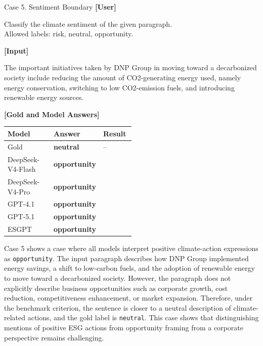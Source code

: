 \documentclass[11pt]{article}
\newcommand{\xmarkred}{\textcolor{casered}{\ding{55}}}
\newcommand{\goldans}[1]{\textbf{#1}}
\newcommand{\wrongans}[1]{\textcolor{casered}{\textbf{#1}}}
\begin{document}

\begin{qualcasebox}{Case 5. Sentiment Boundary}
\small
\textbf{[User]}

\footnotesize
Classify the climate sentiment of the given paragraph.\\  
Allowed labels: risk, neutral, opportunity.

\vspace{0.6em}
\textbf{[Input]}

\footnotesize
The important initiatives taken by DNP Group in moving toward a decarbonized society include reducing the amount of CO2-generating energy used, namely energy conservation, switching to low CO2-emission fuels, and introducing renewable energy sources.

\tcblower

\small
\textbf{[Gold and Model Answers]}

\vspace{0.2em}
\footnotesize
\begin{tabularx}{1.0\linewidth}{@{}Y C{0.25\linewidth} C{0.25\linewidth}@{}}
\hline
\textbf{Model} & \textbf{Answer} & \textbf{Result} \\
\hline
Gold & \goldans{neutral} & -- \\
\hline
DeepSeek-V4-Flash & \wrongans{opportunity} & \xmarkred \\
DeepSeek-V4-Pro & \wrongans{opportunity} & \xmarkred \\
GPT-4.1 & \wrongans{opportunity} & \xmarkred \\
GPT-5.1 & \wrongans{opportunity} & \xmarkred \\
\textsf{ESGPT} & \wrongans{opportunity} & \xmarkred \\
\hline
\end{tabularx}
\end{qualcasebox}
Case 5 shows a case where all models interpret positive climate-action expressions as \texttt{opportunity}. The input paragraph describes how DNP Group implemented energy savings, a shift to low-carbon fuels, and the adoption of renewable energy to move toward a decarbonized society. However, the paragraph does not explicitly describe business opportunities such as corporate growth, cost reduction, competitiveness enhancement, or market expansion. Therefore, under the benchmark criterion, the sentence is closer to a neutral description of climate-related actions, and the gold label is \texttt{neutral}. This case shows that distinguishing mentions of positive ESG actions from opportunity framing from a corporate perspective remains challenging.
\end{document}
